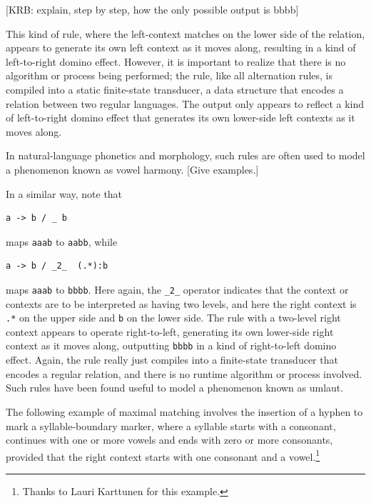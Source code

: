 [KRB:  explain, step by step, how the only possible output is bbbb]

This kind of rule, where the left-context matches on
the lower side of the relation, appears to generate its own left context as it moves
along, resulting in a kind of left-to-right domino effect.  However, it is
important to realize that there is no algorithm or process being performed; the rule,
like all alternation rules, is compiled into a static finite-state transducer, a data
structure that encodes a
relation between two regular languages.  The output only appears to reflect a kind of
left-to-right domino effect that generates its own lower-side left contexts as it
moves along.

In natural-language phonetics and morphology, such rules are often used to model a phenomenon known
as vowel harmony.  [Give examples.]

In a similar way, note that

\begin{Verbatim}
a -> b / _ b
\end{Verbatim}

\noindent
maps \texttt{aaab} to \texttt{aabb}, while

\begin{Verbatim}
a -> b / _2_  (.*):b
\end{Verbatim}

\noindent
maps \texttt{aaab} to \texttt{bbbb}.  Here again, the \verb!_2_! operator indicates that the context or contexts are to
be interpreted as having two levels, and here the right context is \verb!.*! on the upper side and \verb!b! on the lower
side.  The rule with a two-level right context appears to
operate right-to-left, generating its own lower-side right context as it moves along, outputting \texttt{bbbb} in a kind
of right-to-left domino effect.
Again, the rule really just compiles into a finite-state transducer that encodes a regular
relation, and there is no runtime algorithm or process involved.
Such rules have been found useful to model a phenomenon known as umlaut.

The following example of maximal matching involves the insertion of a hyphen to mark a syllable-boundary
marker, where a syllable starts with a
consonant, continues with one or more vowels and ends with zero or more consonants,
provided that the right context starts with one consonant and a vowel.\footnote{Thanks to
Lauri Karttunen for this example.}

